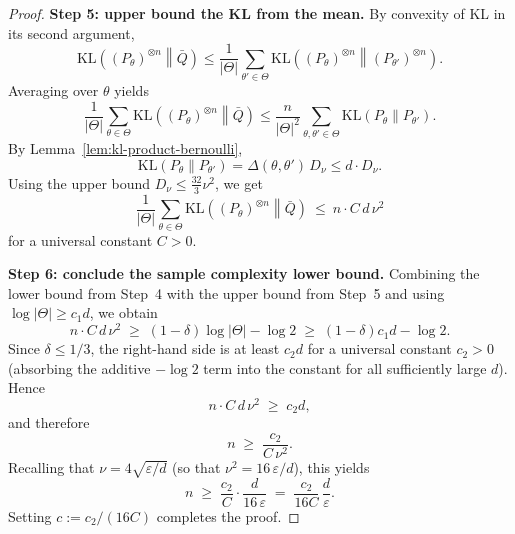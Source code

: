 \documentclass[arxiv]{colt2026}
\newcommand{\eps}{\varepsilon}
\newcommand{\KL}{\mathrm{KL}}
\begin{document}
\begin{proof}
\medskip
\noindent\textbf{Step 5: upper bound the KL from the mean.}
By convexity of KL in its second argument,
\[
\KL\!\left((P_\theta)^{\otimes n}\middle\|\bar Q\right)
\le
\frac1{|\Theta|}\sum_{\theta'\in\Theta}
\KL\!\left((P_\theta)^{\otimes n}\middle\|(P_{\theta'})^{\otimes n}\right).
\]
Averaging over $\theta$ yields
\[
\frac1{|\Theta|}\sum_{\theta\in\Theta}
\KL\!\left((P_\theta)^{\otimes n}\middle\|\bar Q\right)
\le
\frac{n}{|\Theta|^2}\sum_{\theta,\theta'\in\Theta}
\KL(P_\theta\|P_{\theta'}).
\]
By Lemma~\ref{lem:kl-product-bernoulli},
\[
\KL(P_\theta\|P_{\theta'})
=\Delta(\theta,\theta')\,D_\nu
\le d\cdot D_\nu.
\]
Using the upper bound $D_\nu\le \frac{32}{3}\nu^2$, we get
\[
\frac1{|\Theta|}\sum_{\theta\in\Theta}
\KL\!\left((P_\theta)^{\otimes n}\middle\|\bar Q\right)
\ \le\ n\cdot C\,d\,\nu^2
\]
for a universal constant $C>0$.

\medskip
\noindent\textbf{Step 6: conclude the sample complexity lower bound.}
Combining the lower bound from Step~4 with the upper bound from Step~5 and using
$\log|\Theta|\ge c_1 d$, we obtain
\[
n\cdot C\,d\,\nu^2
\;\ge\;
(1-\delta)\log|\Theta|-\log 2
\;\ge\;
(1-\delta)c_1 d-\log 2 .
\]
Since $\delta\le 1/3$, the right-hand side is at least $c_2 d$ for a universal
constant $c_2>0$ (absorbing the additive $-\log 2$ term into the constant for
all sufficiently large $d$). Hence
\[
n\cdot C\,d\,\nu^2 \;\ge\; c_2 d,
\]
and therefore
\[
n
\;\ge\;
\frac{c_2}{C\,\nu^2}.
\]
Recalling that $\nu = 4\sqrt{\eps/d}$ (so that $\nu^2 = 16\,\eps/d$), this yields
\[
n
\;\ge\;
\frac{c_2}{C}\cdot \frac{d}{16\,\eps}
\;=\;
\frac{c_2}{16C}\,\frac{d}{\eps}.
\]
Setting $c:=c_2/(16C)$ completes the proof.
\end{proof}
\end{document}
